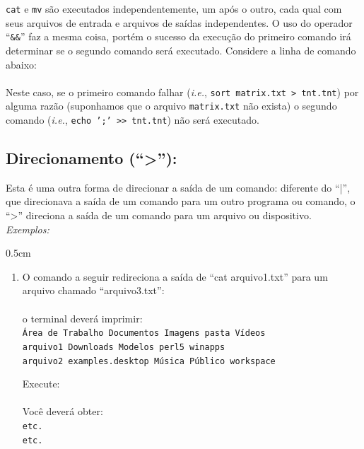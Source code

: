 \begin{refsection}
\texttt{cat} e \texttt{mv} são executados independentemente, um após o outro, cada qual com seus arquivos de entrada e arquivos de saídas independentes. O uso do operador ``\texttt{\&\&}'' faz a mesma coisa, portém o sucesso da execução do primeiro comando irá determinar se o segundo comando será executado. Considere a linha de comando abaixo:\\

\\

Neste caso, se o primeiro comando falhar (\textit{i.e.}, \texttt{sort matrix.txt > tnt.tnt}) por alguma razão (suponhamos que o arquivo \texttt{matrix.txt} não exista) o segundo comando (\textit{i.e.}, \texttt{echo ';' >> tnt.tnt}) não será executado.\\


\subsection{ Direcionamento (``>''):}\label{tut1:pipered:direcionamento}

Esta é uma outra forma de direcionar a saída de um comando: diferente do ``|'', que direcionava a saída de um comando para um outro programa ou comando, o ``>'' direciona a saída de um comando para um arquivo ou dispositivo.\\

\textit{Exemplos:}
 \begin {myindentpar}{0.5cm}
 \begin{enumerate}[\itshape i.]
\item{O comando a seguir redireciona a saída de ``cat arquivo1.txt'' para um arquivo chamado ``arquivo3.txt'':}
\\
\\
o terminal deverá imprimir:\\
\texttt{Área de Trabalho  Documentos        Imagens  pasta    Vídeos\\
arquivo1          Downloads         Modelos  perl5    winapps\\
arquivo2          examples.desktop  Música   Público  workspace\\}

Execute:\\
\\
Você deverá obter:\\
\texttt{etc.\\
etc.\\}


\end{enumerate}
\end{myindentpar}
\end{refsection}
